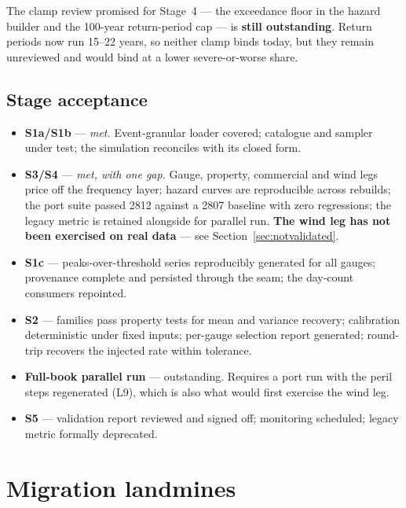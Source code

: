 \documentclass[11pt]{article}
\begin{document}
\noindent The clamp review promised for Stage~4 --- the exceedance floor in the
hazard builder and the 100-year return-period cap --- is \textbf{still
outstanding}. Return periods now run 15--22 years, so neither clamp binds today,
but they remain unreviewed and would bind at a lower severe-or-worse share.

\subsection{Stage acceptance}

\begin{itemize}[nosep]
  \item \textbf{S1a/S1b} --- \emph{met.} Event-granular loader covered;
        catalogue and sampler under test; the simulation reconciles with its
        closed form.
  \item \textbf{S3/S4} --- \emph{met, with one gap.} Gauge, property, commercial
        and wind legs price off the frequency layer; hazard curves are
        reproducible across rebuilds; the port suite passed 2812 against a 2807
        baseline with zero regressions; the legacy metric is retained alongside
        for parallel run. \textbf{The wind leg has not been exercised on real
        data} --- see Section~\ref{sec:notvalidated}.
  \item \textbf{S1c} --- peaks-over-threshold series reproducibly generated for
        all gauges; provenance complete and persisted through the seam; the
        day-count consumers repointed.
  \item \textbf{S2} --- families pass property tests for mean and variance
        recovery; calibration deterministic under fixed inputs; per-gauge
        selection report generated; round-trip recovers the injected rate within
        tolerance.
  \item \textbf{Full-book parallel run} --- outstanding. Requires a port run
        with the peril steps regenerated (L9), which is also what would first
        exercise the wind leg.

  \item \textbf{S5} --- validation report reviewed and signed off; monitoring
        scheduled; legacy metric formally deprecated.
\end{itemize}

\section{Migration landmines}
\end{document}

